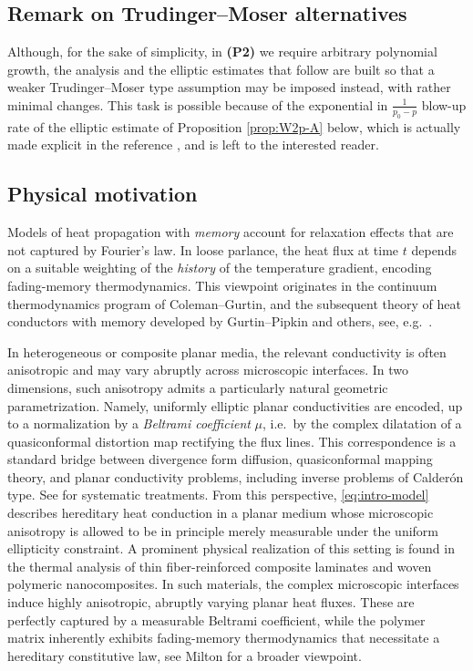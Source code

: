 \documentclass[12pt,leqno]{amsart}
\theoremstyle{definition}
\numberwithin{equation}{section}
\numberwithin{figure}{section}
\begin{document}
\subsection{Remark on Trudinger--Moser alternatives}
Although, for the sake of simplicity, in \textbf{(P2)}  we require arbitrary polynomial growth,
 the analysis and the elliptic estimates that follow are built so that  a weaker Trudinger--Moser type  assumption may be imposed instead, with rather minimal changes. This task is possible because of the   exponential in $\frac{1}{p_0-p}$ blow-up rate of the elliptic estimate of Proposition \ref{prop:W2p-A} below, which is actually made explicit in the reference \cite{DPF}, and is    left  to the interested reader. 


\subsection{Physical motivation}
Models of heat propagation with \emph{memory} account for relaxation effects that are not captured by
Fourier's law. In loose parlance, the heat flux at time $t$ depends on a suitable weighting of the  \emph{history} of the temperature gradient,
encoding fading-memory thermodynamics. This viewpoint
originates in the continuum thermodynamics program of Coleman--Gurtin,  
  and the subsequent theory of heat conductors with memory developed by Gurtin--Pipkin and
others, see, e.g.\ \cites{CGZAMP67,GP68,Nun71}.

In heterogeneous or composite planar media, the relevant conductivity is often anisotropic and may
vary abruptly across microscopic interfaces.  In two dimensions, such anisotropy admits a particularly
natural geometric parametrization. Namely, uniformly elliptic planar conductivities are encoded, up to a
normalization by a \emph{Beltrami coefficient} $\mu$, i.e.\ by the complex dilatation of a quasiconformal
distortion map rectifying the   flux lines.  This  correspondence is a standard
bridge between divergence form diffusion, quasiconformal mapping theory, and planar conductivity
problems, including inverse problems of  Calder\'on type. See   \cites{AIM,AP06} for systematic treatments.
From this perspective, \eqref{eq:intro-model} describes hereditary heat conduction in a planar medium
whose microscopic anisotropy is allowed to be in principle merely measurable under the uniform
ellipticity constraint. A prominent physical realization of this setting is found in the thermal analysis of thin fiber-reinforced composite laminates and woven polymeric nanocomposites. In such materials, the complex microscopic interfaces induce highly anisotropic, abruptly varying planar heat fluxes. These are perfectly captured by a measurable Beltrami coefficient, while the polymer matrix inherently exhibits fading-memory thermodynamics that necessitate a hereditary constitutive law, see Milton \cite{Milt} for a broader viewpoint.
\end{document}
